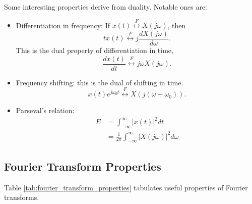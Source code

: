 Some interesting properties derive from duality. Notable ones are:

\begin{itemize}
    \item Differentiation in frequency: If $x(t) \overset{F}{\leftrightarrow} X(j\omega)$,
          then
          \begin{equation}
              tx(t)  \overset{F}{\leftrightarrow} j\frac{dX(j\omega)}{d\omega}.
          \end{equation}
          This is the dual property of differentiation in time,
          \begin{equation}
              \frac{dx(t)}{dt} \overset{F}{\leftrightarrow} j\omega X(j\omega).
          \end{equation}
    \item Frequency shifting: this is the dual of shifting in time.
          \begin{equation}
              x(t)e^{j\omega_0 t} \overset{F}{\leftrightarrow} X(j(\omega-\omega_0)).
          \end{equation}
    \item Parseval's relation:
          \begin{align}
              E & = \int_{-\infty}^{\infty} |x(t)|^2 dt                           \\
                & = \frac{1}{2\pi} \int_{-\infty}^{\infty} |X(j\omega)|^2 d\omega
          \end{align}
\end{itemize}

\subsection{Fourier Transform Properties}

Table \ref{tab:fourier_transform_properties} tabulates
useful properties of Fourier transforms.

